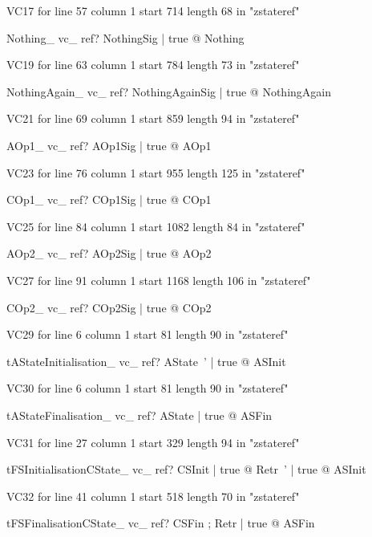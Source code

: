 \documentclass{article}
\begin{document}
VC17 for line 57 column 1 start 714 length 68 in "zstateref"
\begin{theorem}{Nothing\_ vc\_ ref}\vdash ? \forall NothingSig | true @ \pre Nothing
\end{theorem}

VC19 for line 63 column 1 start 784 length 73 in "zstateref"
\begin{theorem}{NothingAgain\_ vc\_ ref}\vdash ? \forall NothingAgainSig | true @ \pre NothingAgain
\end{theorem}

VC21 for line 69 column 1 start 859 length 94 in "zstateref"
\begin{theorem}{AOp1\_ vc\_ ref}\vdash ? \forall AOp1Sig | true @ \pre AOp1
\end{theorem}

VC23 for line 76 column 1 start 955 length 125 in "zstateref"
\begin{theorem}{COp1\_ vc\_ ref}\vdash ? \forall COp1Sig | true @ \pre COp1
\end{theorem}

VC25 for line 84 column 1 start 1082 length 84 in "zstateref"
\begin{theorem}{AOp2\_ vc\_ ref}\vdash ? \forall AOp2Sig | true @ \pre AOp2
\end{theorem}

VC27 for line 91 column 1 start 1168 length 106 in "zstateref"
\begin{theorem}{COp2\_ vc\_ ref}\vdash ? \forall COp2Sig | true @ \pre COp2
\end{theorem}

VC29 for line 6 column 1 start 81 length 90 in "zstateref"
\begin{theorem}{tAStateInitialisation\_ vc\_ ref}\vdash ? \exists AState~' | true @ ASInit
\end{theorem}

VC30 for line 6 column 1 start 81 length 90 in "zstateref"
\begin{theorem}{tAStateFinalisation\_ vc\_ ref}\vdash ? \exists AState | true @ ASFin
\end{theorem}

VC31 for line 27 column 1 start 329 length 94 in "zstateref"
\begin{theorem}{tFSInitialisationCState\_ vc\_ ref}\vdash ? \forall CSInit | true @ \exists Retr~' | true @ ASInit
\end{theorem}

VC32 for line 41 column 1 start 518 length 70 in "zstateref"
\begin{theorem}{tFSFinalisationCState\_ vc\_ ref}\vdash ? \forall CSFin ; Retr | true @ ASFin
\end{theorem}
\end{document}

